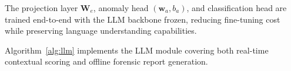 The projection layer
$\mathbf{W}_e$, anomaly head $(\mathbf{w}_a, b_a)$, and
classification head are trained end-to-end with the LLM
backbone frozen, reducing fine-tuning cost while preserving
language understanding capabilities.


Algorithm~\ref{alg:llm} implements the LLM module
covering both real-time contextual scoring and offline
forensic report generation.


